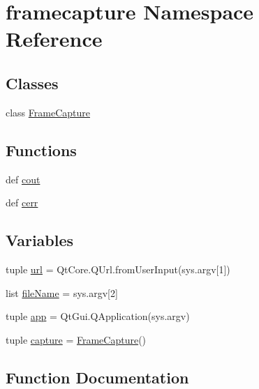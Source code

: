 \hypertarget{namespaceframecapture}{}\section{framecapture Namespace Reference}
\label{namespaceframecapture}
\subsection*{Classes}
\begin{DoxyCompactItemize}
\item 
class \hyperlink{classframecapture_1_1FrameCapture}{Frame\+Capture}
\end{DoxyCompactItemize}
\subsection*{Functions}
\begin{DoxyCompactItemize}
\item 
def \hyperlink{namespaceframecapture_a4a9ed3b2cd83ffcce400c4d744f60959}{cout}
\item 
def \hyperlink{namespaceframecapture_a9cb8331a2fada1f46fade78b710ec44d}{cerr}
\end{DoxyCompactItemize}
\subsection*{Variables}
\begin{DoxyCompactItemize}
\item 
tuple \hyperlink{namespaceframecapture_aff59b23fef660dedf48b2a105fa7d427}{url} = Qt\+Core.\+Q\+Url.\+from\+User\+Input(sys.\+argv\mbox{[}1\mbox{]})
\item 
list \hyperlink{namespaceframecapture_a9986642fe1c3b56d649b6411961b7ed5}{file\+Name} = sys.\+argv\mbox{[}2\mbox{]}
\item 
tuple \hyperlink{namespaceframecapture_a0e9bf61c7abd17366742c9a45598e548}{app} = Qt\+Gui.\+Q\+Application(sys.\+argv)
\item 
tuple \hyperlink{namespaceframecapture_a5a40ddd7c0162a31169f8f8d51944f92}{capture} = \hyperlink{classframecapture_1_1FrameCapture}{Frame\+Capture}()
\end{DoxyCompactItemize}


\subsection{Function Documentation}
\hypertarget{namespaceframecapture_a9cb8331a2fada1f46fade78b710ec44d}{}
